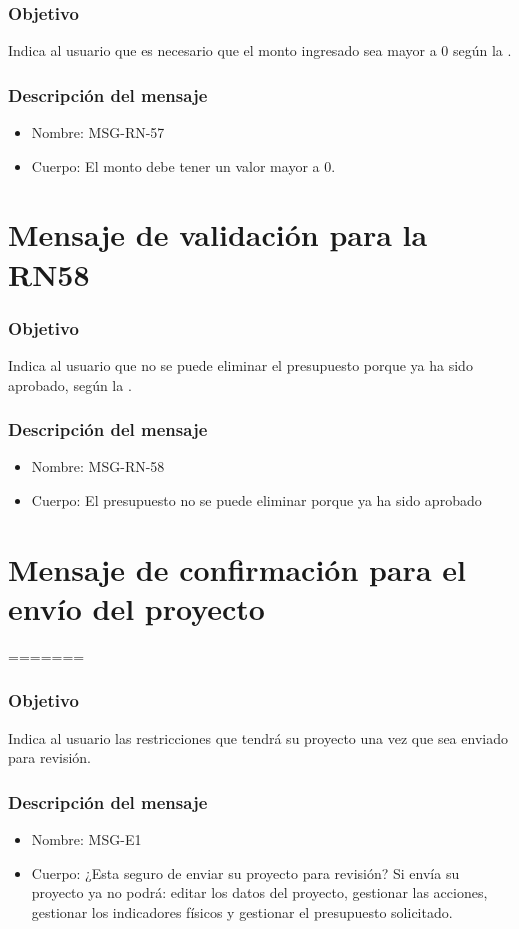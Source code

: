 \subsubsection{Objetivo}
Indica al usuario que es necesario que el monto ingresado sea mayor a 0 según la .

\subsubsection{Descripción del mensaje}
\begin{itemize}
\item Nombre: MSG-RN-57
\item Cuerpo: El monto debe tener un valor mayor a 0.
\end{itemize}

\section{Mensaje de validación para la RN58} \label{MSG_RN58}

\subsubsection{Objetivo}
Indica al usuario que no se puede eliminar el presupuesto porque ya ha sido aprobado,  según la .

\subsubsection{Descripción del mensaje}
\begin{itemize}
\item Nombre: MSG-RN-58
\item Cuerpo: El presupuesto no se puede eliminar porque ya ha sido aprobado
\end{itemize}

\section{Mensaje de confirmación para el envío del proyecto} \label{MSGE1}

=======
\subsubsection{Objetivo}
Indica al usuario las restricciones que tendrá su proyecto una vez que sea enviado para revisión.

\subsubsection{Descripción del mensaje}
\begin{itemize}
\item Nombre: MSG-E1
\item Cuerpo: ¿Esta seguro de enviar su proyecto para revisión? Si envía su proyecto ya no podrá: editar los datos del proyecto, gestionar las acciones, gestionar los indicadores físicos y gestionar el presupuesto solicitado. 
\end{itemize}


